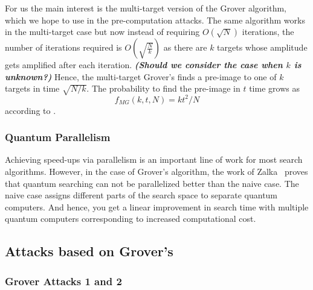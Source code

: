 For us the main interest is the multi-target version of the Grover algorithm, which we hope to use in the pre-computation attacks. The same algorithm works in the multi-target case but now instead of requiring $O(\sqrt{N})$ iterations, the number of iterations required is $O(\sqrt{\frac{N}{k}})$ as there are $k$ targets whose amplitude gets amplified after each iteration. \textbf{\textit{(Should we consider the case when $k$ is unknown?)}} Hence, the multi-target Grover's finds a pre-image  to one of $k$ targets in time $\sqrt{N/k}$. The probability to find the pre-image in $t$ time grows as 
\begin{equation}
    \label{eq:mt-grover}
    f_{MG}(k,t,N) = kt^2/N
\end{equation}according to \cite{Brassard_2002}.

\subsubsection{Quantum Parallelism}

Achieving speed-ups via parallelism is an important line of work for most search algorithms. However, in the case of Grover's algorithm, the work of Zalka~\cite{Zalka_1999} proves that quantum searching can not be parallelized better than the naive case. The naive case assigns different parts of the search space to separate quantum computers. And hence, you get a linear improvement in search time with multiple quantum computers corresponding to increased computational cost. 

\subsection{Attacks based on Grover's}

\subsubsection{Grover Attacks 1 and 2}

